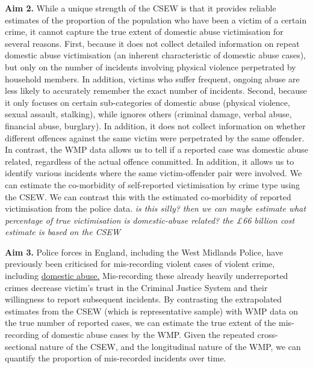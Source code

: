 \documentclass[11pt, a4paper]{article}
\begin{document}
\textbf{Aim 2.}  While a unique strength of the CSEW is that it provides reliable estimates of the proportion of the population who have been a victim of a certain crime, it cannot capture the true extent of domestic abuse victimisation for several reasons. First, because it does not collect detailed information on repeat domestic abuse victimisation (an inherent characteristic of domestic abuse cases), but only on the number of incidents involving physical violence perpetrated by household members. In addition, victims who suffer frequent, ongoing abuse are less likely to accurately remember the exact number of incidents. Second, because it only focuses on certain sub-categories of domestic abuse (physical violence, sexual assault, stalking), while ignores others (criminal damage, verbal abuse, financial abuse, burglary). In addition, it does not collect information on whether different offences against the same victim were perpetrated by the same offender. In contrast, the WMP data allows us to tell if a reported case was domestic abuse related, regardless of the actual offence committed. In addition, it allows us to identify various incidents where the same victim-offender pair were involved. We can estimate the co-morbidity of self-reported victimisation by crime type using the CSEW. We can contrast this with the estimated co-morbidity of reported victimisation from the police data. \textit{is this silly? then we can maybe estimate what percentage of true victimisation is domestic-abuse related? the £66 billion cost estimate is based on the CSEW}





\textbf{Aim 3.} Police forces in England, including the West Midlands Police, have previously been criticised for mis-recording violent cases of violent crime, including \href{https://www.bbc.co.uk/news/uk-england-468676578}{domestic abuse.} Mis-recording these already heavily underreported crimes decrease victim's trust in the Criminal Justice System and their willingness to report subsequent incidents. By contrasting the extrapolated estimates from the CSEW (which is representative sample) with WMP data on the true number of reported cases, we can estimate the true extent of the mis-recording of domestic abuse cases by the WMP. Given the repeated cross-sectional nature of the CSEW, and the longitudinal nature of the WMP, we can quantify the proportion of mis-recorded incidents over time.
\end{document}
